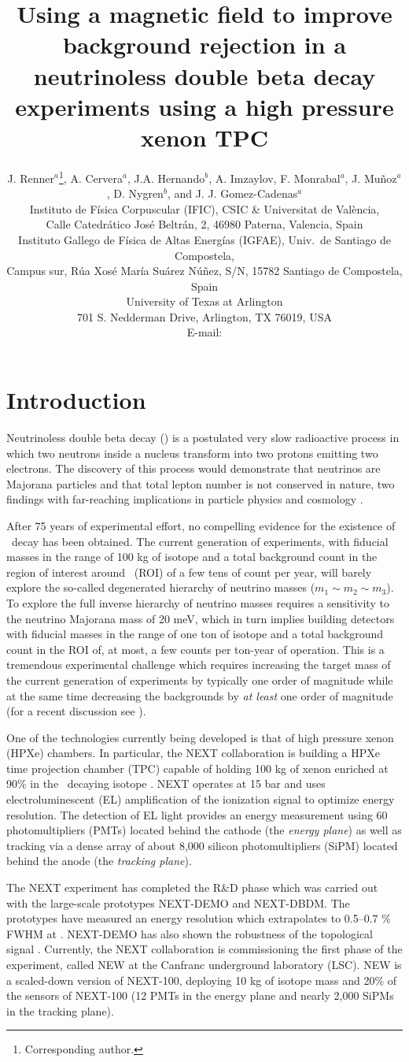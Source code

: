 \documentclass{JINST}
\title{Using a magnetic field to improve background rejection in a neutrinoless double beta decay experiments using a high pressure xenon TPC}
\author{J. Renner$^a$\thanks{Corresponding author.},
A. Cervera$^a$, J.A. Hernando$^b$, A. Imzaylov, F. Monrabal$^a$, J. Mu\~noz$^a$, D. Nygren$^b$, and J. J. Gomez-Cadenas$^a$\\
\llap{$^a$}Instituto de F\'isica Corpuscular (IFIC), CSIC \& Universitat de Val\`encia,\\ 
Calle Catedr\'atico Jos\'e Beltr\'an, 2, 46980 Paterna, Valencia, Spain\\
\llap{$^b$}Instituto Gallego de F\'isica de Altas Energ\'ias (IGFAE), Univ.\ de Santiago de Compostela,\\ Campus sur, R\'ua Xos\'e Mar\'ia Su\'arez N\'u\~nez, S/N, 15782 Santiago de Compostela, Spain\\
\llap{$^c$}University of Texas at Arlington\\
 701 S. Nedderman Drive, Arlington, TX 76019, USA\\
E-mail: \email{jrenner@ific.uv.es}}
\begin{document}
\section{Introduction}\label{sec:intro}

Neutrinoless double beta decay (\bbonu) is a postulated very slow radioactive process in which two neutrons inside a nucleus transform into two protons emitting two electrons. The discovery of this process would demonstrate that neutrinos are Majorana particles and that total lepton number is not conserved in nature, two findings with far-reaching implications in particle physics and cosmology \cite{Gomez_2013, GomezCadenas:2013ue, Cadenas_2012}.

After 75 years of experimental effort, no compelling evidence for the existence of \bbonu\ decay has been obtained. The current generation of experiments, with fiducial masses in the range of 100 kg of isotope and a total background count in the region of interest around \Qbb\ (ROI) of a few tens of count per year, will barely explore the so-called degenerated hierarchy of neutrino masses ($m_1 \sim m_2 \sim m_3$). To explore the full inverse hierarchy of neutrino masses requires a sensitivity to the neutrino Majorana mass of 20 meV, which in turn implies building detectors with fiducial masses in the range of one ton of isotope and a total background count in the ROI of, at most, a few counts per ton-year of operation. This is a tremendous experimental challenge which requires increasing the target mass of the current generation of experiments by typically one order of magnitude while at the same time decreasing the backgrounds by {\em at least} one order of magnitude (for a recent discussion see \cite{Gomez-Cadenas:2015twa}).

One of the technologies currently being developed is that of high pressure xenon (HPXe) chambers. In particular, the NEXT collaboration \cite{Gomez-Cadenas:2014dxa} is building a HPXe time projection chamber (TPC) capable of holding 100 kg of xenon enriched at 90\% in the \bb\ decaying isotope \XE. NEXT operates at 15 bar and uses electroluminescent (EL) amplification of the ionization signal to optimize energy resolution. The detection of EL light provides an energy measurement using 60 photomultipliers (PMTs) located behind the cathode (the \emph{energy plane}) as well as tracking  via a dense array of about 8,000 silicon photomultipliers (SiPM) located behind the anode (the \emph{tracking plane}).

The NEXT experiment has completed the R\&D phase which was carried out with the large-scale prototypes NEXT-DEMO and NEXT-DBDM. The prototypes have measured an energy resolution which extrapolates to 0.5--0.7 \% FWHM at \Qbb. NEXT-DEMO has also shown the robustness of the topological signal \cite{Alvarez:2012xda,Alvarez:2012kua,Alvarez:2013gxa,Lorca:2014sra}. Currently, the NEXT collaboration is commissioning the first phase of the experiment, called NEW at the Canfranc underground laboratory (LSC). NEW is a scaled-down version of NEXT-100, deploying 10 kg of isotope mass and 20\% of the sensors of NEXT-100 (12 PMTs in the energy plane and nearly 2,000 SiPMs in the tracking plane).
\end{document}
